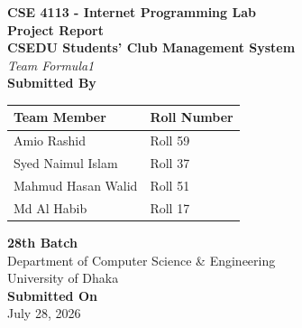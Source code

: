 \documentclass[12pt, a4paper]{article}
\begin{document}
\begin{titlepage}
    \centering
    \vspace*{0.5cm}
    
    {\large \bfseries \color{accentdark} CSE 4113 - Internet Programming Lab}\\[1.5cm]
    
    {\Huge \bfseries \color{primaryblue} Project Report}\\[1.2cm]
    
    {\huge \bfseries \color{primaryblue} CSEDU Students' Club Management System}\\[0.3cm]
    {\large \itshape \color{secondaryteal} Team Formula1}\\[2.0cm]
    
    {\Large \bfseries \color{accentdark} Submitted By}\\[0.5cm]
    
    \begin{table}[h!]
    \centering
    \renewcommand{\arraystretch}{1.4}
    \begin{tabular}{|p{7cm}|p{6cm}|}
    \hline
    \rowcolor{primaryblue} \color{white}\textbf{Team Member} & \color{white}\textbf{Roll Number} \\ \hline
    Amio Rashid & Roll 59 \\ \hline
    Syed Naimul Islam & Roll 37 \\ \hline
    Mahmud Hasan Walid & Roll 51 \\ \hline
    Md Al Habib & Roll 17 \\ \hline
    \end{tabular}
    \end{table}
    
    \vfill
    
    {\large \bfseries \color{accentdark} 28th Batch}\\[0.1cm]
    {\large \color{accentdark} Department of Computer Science \& Engineering}\\[0.1cm]
    {\large \color{accentdark} University of Dhaka}\\[1.0cm]
    
    {\large \bfseries Submitted On}\\[0.2cm]
    {\large July 28, 2026}
    
    \vspace*{0.5cm}
\end{titlepage}
\end{document}
